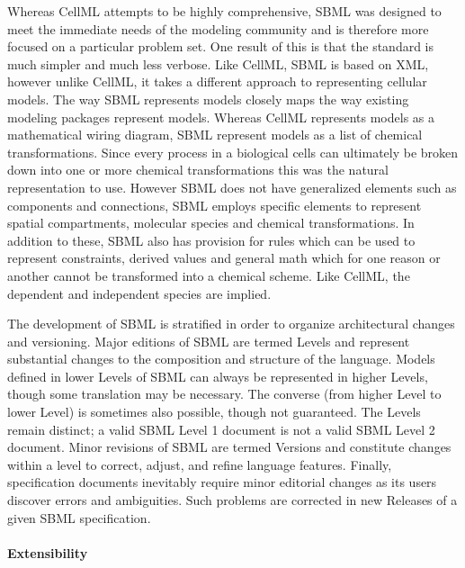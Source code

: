 \documentclass[]{article}
\begin{document}
Whereas CellML attempts to be highly comprehensive, SBML was designed to
meet the immediate needs of the modeling community and is therefore more
focused on a particular problem set. One result of this is that the
standard is much simpler and much less verbose. Like CellML, SBML is
based on XML, however unlike CellML, it takes a different approach to
representing cellular models. The way SBML represents models closely
maps the way existing modeling packages represent models. Whereas CellML
represents models as a mathematical wiring diagram, SBML represent
models as a list of chemical transformations. Since every process in a
biological cells can ultimately be broken down into one or more chemical
transformations this was the natural representation to use. However SBML
does not have generalized elements such as components and connections,
SBML employs specific elements to represent spatial compartments,
molecular species and chemical transformations. In addition to these,
SBML also has provision for rules which can be used to represent
constraints, derived values and general math which for one reason or
another cannot be transformed into a chemical scheme. Like CellML, the
dependent and independent species are implied.

The development of SBML is stratified in order to organize architectural
changes and versioning. Major editions of SBML are termed Levels and
represent substantial changes to the composition and structure of the
language. Models defined in lower Levels of SBML can always be
represented in higher Levels, though some translation may be necessary.
The converse (from higher Level to lower Level) is sometimes also
possible, though not guaranteed. The Levels remain distinct; a valid
SBML Level 1 document is not a valid SBML Level 2 document. Minor
revisions of SBML are termed Versions and constitute changes within a
level to correct, adjust, and refine language features. Finally,
specification documents inevitably require minor editorial changes as
its users discover errors and ambiguities. Such problems are corrected
in new Releases of a given SBML specification.

\paragraph{Extensibility}
\end{document}
